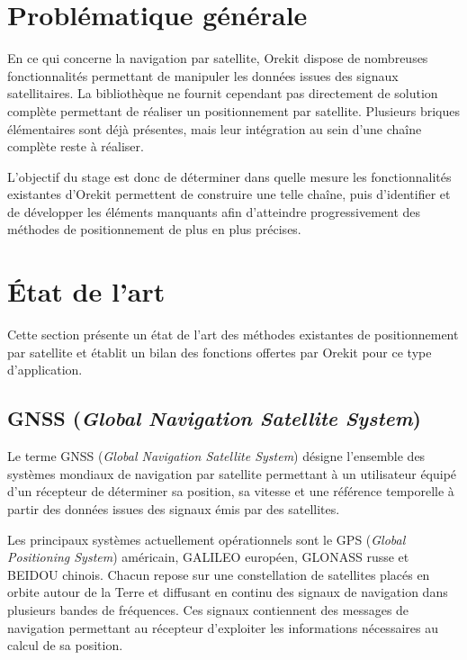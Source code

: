 \section{Problématique générale}

En ce qui concerne la navigation par satellite, Orekit dispose de nombreuses fonctionnalités permettant de manipuler les données issues des signaux satellitaires. La bibliothèque ne fournit cependant pas directement de solution complète permettant de réaliser un positionnement par satellite. Plusieurs briques élémentaires sont déjà présentes, mais leur intégration au sein d'une chaîne complète reste à réaliser.

L'objectif du stage est donc de déterminer dans quelle mesure les fonctionnalités existantes d'Orekit permettent de construire une telle chaîne, puis d'identifier et de développer les éléments manquants afin d'atteindre progressivement des méthodes de positionnement de plus en plus précises.

\section{État de l'art}

Cette section présente un état de l'art des méthodes existantes de positionnement par satellite et établit un bilan des fonctions offertes par Orekit pour ce type d'application.

\subsection{GNSS (\textit{Global Navigation Satellite System})}

Le terme GNSS (\textit{Global Navigation Satellite System}) désigne l'ensemble des systèmes mondiaux de navigation par satellite permettant à un utilisateur équipé d'un récepteur de déterminer sa position, sa vitesse et une référence temporelle à partir des données issues des signaux émis par des satellites.

Les principaux systèmes actuellement opérationnels sont le GPS (\textit{Global Positioning System}) américain, GALILEO européen, GLONASS russe et BEIDOU chinois. Chacun repose sur une constellation de satellites placés en orbite autour de la Terre et diffusant en continu des signaux de navigation dans plusieurs bandes de fréquences. Ces signaux contiennent des messages de navigation permettant au récepteur d'exploiter les informations nécessaires au calcul de sa position. 

